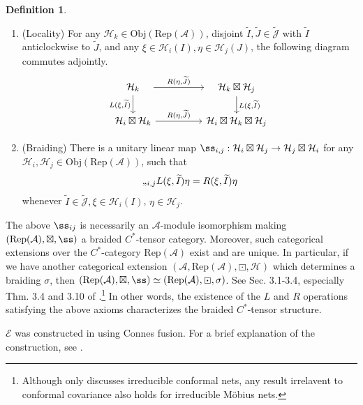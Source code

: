 \documentclass[12pt,a4paper,notitlepage]{article}
\theoremstyle{definition}
\newtheorem{df}{Definition}[section]
\theoremstyle{plain}
\newcommand{\mc}{\mathcal}
\newcommand{\wtd}{\widetilde}
\newcommand{\Rep}{\mathrm{Rep}}
\newcommand{\scr}{\mathscr}
\newcommand{\Jtd}{\widetilde{\mathcal J}}
\newcommand{\RepA}{\mathrm{Rep}(\mathcal A)}
\newcommand{\UPSU}{\widetilde{\mathrm{PSU}}(1,1)}
\newcommand{\Obj}{\mathrm{Obj}}
\numberwithin{equation}{section}
\begin{document}
\begin{df}
\begin{enumerate}[label=(\alph*)]
\item (Locality) For any $\mc H_k\in\Obj(\RepA)$, disjoint $\wtd I,\wtd J\in\Jtd$ with $\wtd I$ anticlockwise to $\wtd J$, and any $\xi\in\mc H_i(I),\eta\in\mc H_j(J)$, the following diagram commutes adjointly.
\begin{equation}
\begin{tikzcd}
\quad \mc H_k\quad \arrow[rr,"{R(\eta,\wtd J)}"] \arrow[d, "{L(\xi,\wtd I)}"'] &&\quad \mc H_k\boxtimes\mc H_j\quad \arrow[d, "{L(\xi,\wtd I)}"]\\
\mc H_i\boxtimes\mc H_k\arrow[rr,"{R(\eta,\wtd J)}"] &&\mc H_i\boxtimes\mc H_k\boxtimes\mc H_j
\end{tikzcd}
\end{equation}
\item (Braiding) There is a unitary linear map $\ss_{i,j}:\mc H_i\boxtimes\mc H_j\rightarrow\mc H_j\boxtimes \mc H_i$  for any $\mc H_i,\mc H_j\in\Obj(\RepA)$, such that  
\begin{align}
	\ss_{i,j} L(\xi,\wtd I)\eta=R(\xi,\wtd I)\eta\label{eq24}
\end{align}
whenever $\wtd I\in\Jtd,\xi\in\mc H_i(I)$, $\eta\in\mc H_j$.
\end{enumerate}
\end{df}

The above $\ss_{ij}$ is necessarily an $\mc A$-module isomorphism making $(\Rep(\mc A),\boxtimes,\ss)$ a braided $C^*$-tensor category. Moreover, such categorical extensions over the $C^*$-category $\RepA$ exist and are unique.  In particular, if we have another categorical extension $(\mc A,\RepA,\boxdot,\mc H)$ which determines a braiding $\sigma$, then $(\RepA,\boxtimes,\ss)\simeq(\RepA,\boxdot,\sigma)$. See Sec. 3.1-3.4, especially Thm. 3.4 and 3.10 of \cite{Gui21a}.\footnote{Although \cite{Gui21a} only discusses irreducible conformal nets, any result irrelavent to conformal covariance also holds for irreducible M\"obius nets. 
} In other words, the existence of the $L$ and $R$ operations satisfying the above axioms characterizes the braided $C^*$-tensor structure.


$\scr E$ was constructed in \cite{Gui21a} using Connes fusion. For a brief explanation of the construction, see \cite[Sec. A]{Gui21b}.
\end{document}
